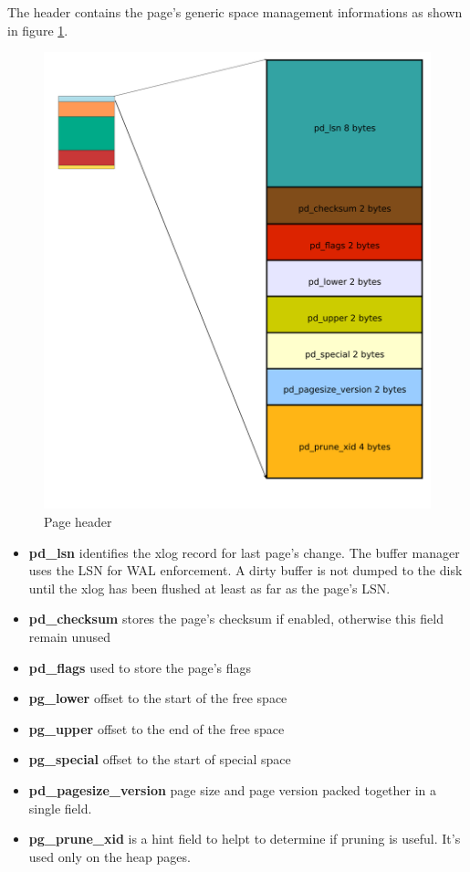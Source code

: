 The header contains the page's generic space management informations as shown 
in figure \ref{fig:HEADERPAG01}. 


\begin{figure}[H]
\begin{center}

\includegraphics[scale=0.55]{images/header_page_01.png}

\caption{Page header}
\label{fig:HEADERPAG01} 
\end{center}

\end{figure}
\begin{itemize}
 \item \textbf{pd\_lsn} identifies the xlog record for last page's change.  The 
buffer manager uses the  LSN for WAL enforcement. A dirty buffer is not dumped 
to the disk until the xlog has been flushed at least as far as the page's LSN.
\item \textbf{pd\_checksum} stores the page's checksum if enabled, otherwise 
this field remain unused
\item \textbf{pd\_flags} used to store the page's flags 
\item \textbf{pg\_lower} offset to the start of the free space
\item \textbf{pg\_upper} offset to the end of the free space
\item \textbf{pg\_special} offset to the start of special space
\item \textbf{pd\_pagesize\_version} page size and page version packed 
together in a single field. 
\item \textbf{pg\_prune\_xid} is a hint field to helpt to determine if pruning 
is useful.  It's used only on the heap pages.

\end{itemize}

